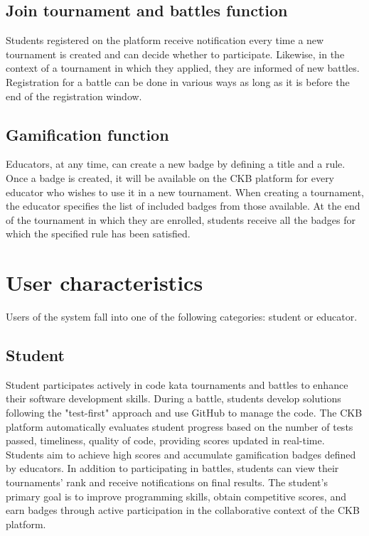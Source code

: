 \subsection{Join tournament and battles function}
Students registered on the platform receive notification every time a new tournament is created and can decide whether to participate.
Likewise, in the context of a tournament in which they applied, they are informed of new battles.
Registration for a battle can be done in various ways as long as it is before the end of the registration window.

\subsection{Gamification function}
Educators, at any time, can create a new badge by defining a title and a rule. 
Once a badge is created, it will be available on the CKB platform for every educator who wishes to use it in a new tournament. 
When creating a tournament, the educator specifies the list of included badges from those available. 
At the end of the tournament in which they are enrolled, students receive all the badges for which the specified rule has been satisfied.

\section{User characteristics}
Users of the system fall into one of the following categories: student or educator.

\subsection*{Student}
Student participates actively in code kata tournaments and battles to enhance their software development skills. 
During a battle, students develop solutions following the "test-first" approach and use GitHub to manage the code. 
The CKB platform automatically evaluates student progress based on the number of tests passed, timeliness, quality of code, providing scores updated in real-time. 
Students aim to achieve high scores and accumulate gamification badges defined by educators. 
In addition to participating in battles, students can view their tournaments' rank and receive notifications on final results. 
The student's primary goal is to improve programming skills, obtain competitive scores, and earn badges through active participation in the collaborative context of the CKB platform.

